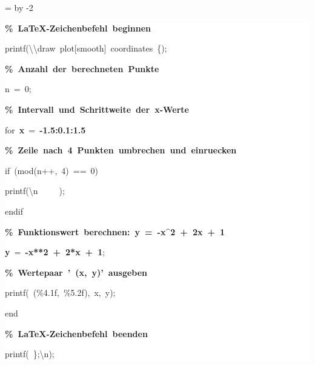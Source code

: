 \begingroup
\ttfamily
{}
=\textwidth
\advance{} by -2\fboxsep
\noindent
\colorbox{background}
{%
\parbox{\dimen255}
{%
\rule[-0.5ex]{0pt}{2.5ex}\hspace*{0.0em}\textcolor{G}{\textbf{\%~LaTeX{-}Zeichenbefehl~beginnen}}\\
\rule[-0.5ex]{0pt}{2.5ex}\hspace*{0.0em}printf(\grqq{}\textbackslash{}\textbackslash{}draw~plot[smooth]~coordinates~\{\grqq{});\\
\rule[-0.5ex]{0pt}{2.5ex}\hspace*{0.0em}\textcolor{G}{\textbf{\%~Anzahl~der~berechneten~Punkte}}\\
\rule[-0.5ex]{0pt}{2.5ex}\hspace*{0.0em}n~=~0;\\
\rule[-0.5ex]{0pt}{2.5ex}\hspace*{0.0em}\textcolor{G}{\textbf{\%~Intervall~und~Schrittweite~der~x{-}Werte}}\\
\rule[-0.5ex]{0pt}{2.5ex}\hspace*{0.0em}for~\textcolor{R}{\textbf{x}}~=~\textcolor{R}{\textbf{{-}1.5:0.1:1.5}}\\
\rule[-0.5ex]{0pt}{2.5ex}\hspace*{1.0em}\textcolor{G}{\textbf{\%~Zeile~nach~4~Punkten~umbrechen~und~einruecken}}\\
\rule[-0.5ex]{0pt}{2.5ex}\hspace*{1.0em}if~(mod(n++,~4)~==~0)\\
\rule[-0.5ex]{0pt}{2.5ex}\hspace*{2.0em}printf(\grqq{}\textbackslash{}n~~~~~\grqq{});\\
\rule[-0.5ex]{0pt}{2.5ex}\hspace*{1.0em}endif\\
\rule[-0.5ex]{0pt}{2.5ex}\hspace*{1.0em}\textcolor{G}{\textbf{\%~Funktionswert~berechnen:~y~=~{-}x\^{}2~+~2x~+~1}}\\
\rule[-0.5ex]{0pt}{2.5ex}\hspace*{1.0em}\textcolor{R}{\textbf{y}}~=~\textcolor{R}{\textbf{{-}x**2~+~2*x~+~1}};\\
\rule[-0.5ex]{0pt}{2.5ex}\hspace*{1.0em}\textcolor{G}{\textbf{\%~Wertepaar~'~(x,~y)'~ausgeben}}\\
\rule[-0.5ex]{0pt}{2.5ex}\hspace*{1.0em}printf(\grqq{}~(\%4.1f,~\%5.2f)\grqq{},~x,~y);\\
\rule[-0.5ex]{0pt}{2.5ex}\hspace*{0.0em}end\\
\rule[-0.5ex]{0pt}{2.5ex}\hspace*{0.0em}\textcolor{G}{\textbf{\%~LaTeX{-}Zeichenbefehl~beenden}}\\
\rule[-0.5ex]{0pt}{2.5ex}\hspace*{0.0em}printf(\grqq{}~\};\textbackslash{}n\grqq{});}%
}%
\endgroup
